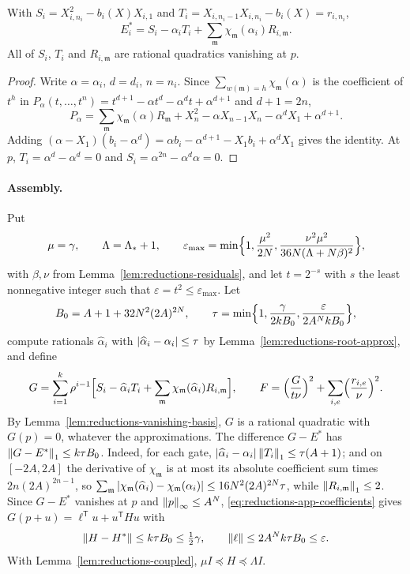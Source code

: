 \begin{lemma}
\label{lem:reductions-vanishing-basis}
With $S_i=X_{i,n_i}^2-b_i(X)X_{i,1}$ and $T_i=X_{i,n_i-1}X_{i,n_i}-b_i(X)=r_{i,n_i}$,
\[
 E_i^*=S_i-\alpha_iT_i+\sum_{\mathfrak m}\chi_{\mathfrak m}(\alpha_i)R_{i,\mathfrak m}.
\]
All of $S_i$, $T_i$ and $R_{i,\mathfrak m}$ are rational quadratics vanishing
at $p$.
\end{lemma}

\begin{proof}
Write $\alpha=\alpha_i$, $d=d_i$, $n=n_i$. Since
$\sum_{w(\mathfrak m)=h}\chi_{\mathfrak m}(\alpha)$ is the coefficient of $t^h$ in
$P_\alpha(t,\ldots,t^n)=t^{d+1}-\alpha t^d-\alpha^dt+\alpha^{d+1}$ and $d+1=2n$,
\[
 P_\alpha=\sum_{\mathfrak m}\chi_{\mathfrak m}(\alpha)R_{\mathfrak m}
 +X_n^2-\alpha X_{n-1}X_n-\alpha^dX_1+\alpha^{d+1}.
\]
Adding $(\alpha-X_1)(b_i-\alpha^d)=\alpha b_i-\alpha^{d+1}-X_1b_i+\alpha^dX_1$ gives
the identity. At $p$, $T_i=\alpha^d-\alpha^d=0$ and
$S_i=\alpha^{2n}-\alpha^d\alpha=0$.
\end{proof}

\paragraph{Assembly.}
Put
\[
 \mu=\gamma,\qquad\Lambda=\Lambda_*+1,\qquad
 \varepsilon_{\max}=\min\Bigl\{1,\frac{\mu^2}{2N},\frac{\nu^2\mu^2}{36N(\Lambda+N\beta)^2}\Bigr\},
\]
with $\beta,\nu$ from Lemma~\ref{lem:reductions-residuals}, and let $t=2^{-s}$
with $s$ the least nonnegative integer such that $\varepsilon=t^2\le\varepsilon_{\max}$. Let
\[
 B_0=A+1+32N^2(2A)^{2N},\qquad
 \tau=\min\Bigl\{1,\frac{\gamma}{2kB_0},\frac{\varepsilon}{2A^NkB_0}\Bigr\},
\]
compute rationals $\widehat\alpha_i$ with $\left\lvert\widehat\alpha_i-\alpha_i\right\rvert\le\tau$
by Lemma~\ref{lem:reductions-root-approx}, and define
\[
 G=\sum_{i=1}^k\rho^{i-1}\Bigl[S_i-\widehat\alpha_iT_i
 +\sum_{\mathfrak m}\chi_{\mathfrak m}(\widehat\alpha_i)R_{i,\mathfrak m}\Bigr],
 \qquad
 F=\Bigl(\frac{G}{t\nu}\Bigr)^2+\sum_{i,e}\Bigl(\frac{r_{i,e}}{\nu}\Bigr)^2.
\]
By Lemma~\ref{lem:reductions-vanishing-basis}, $G$ is a rational quadratic with
$G(p)=0$, whatever the approximations. The difference $G-E^*$ has
$\left\lVert G-E^*\right\rVert_1\le k\tau B_0$. Indeed, for each gate, $\left\lvert\widehat\alpha_i-\alpha_i\right\rvert\left\lVert T_i\right\rVert_1
\le\tau(A+1)$; and on $[-2A,2A]$ the derivative of $\chi_{\mathfrak m}$ is
at most its absolute coefficient sum times $2n(2A)^{2n-1}$, so
$\sum_{\mathfrak m}\left\lvert\chi_{\mathfrak m}(\widehat\alpha_i)-\chi_{\mathfrak m}(\alpha_i)\right\rvert
\le16N^2(2A)^{2N}\tau$, while $\left\lVert R_{i,\mathfrak m}\right\rVert_1\le2$. Since
$G-E^*$ vanishes at $p$ and $\left\lVert p\right\rVert_\infty\le A^N$,
\eqref{eq:reductions-app-coefficients} gives
$G(p+u)=\ell^{\mathsf T}u+u^{\mathsf T}Hu$ with
\[
 \left\lVert H-H^*\right\rVert\le k\tau B_0\le\tfrac12\gamma,\qquad
 \left\lVert\ell\right\rVert\le2A^Nk\tau B_0\le\varepsilon .
\]
With Lemma~\ref{lem:reductions-coupled}, $\mu I\preceq H\preceq\Lambda I$.

